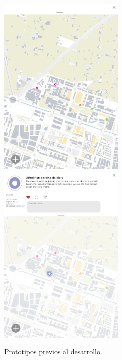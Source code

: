 \documentclass{article}
\begin{document}
\begin{figure}[H]
    \center
    \includegraphics[width=6cm]{images/mockup1.png}
    \includegraphics[width=6cm]{images/mockup2.png}
    \caption{Prototipos previos al desarrollo.}
    \label{fig:prototipos-previos}
\end{figure}
\end{document}
